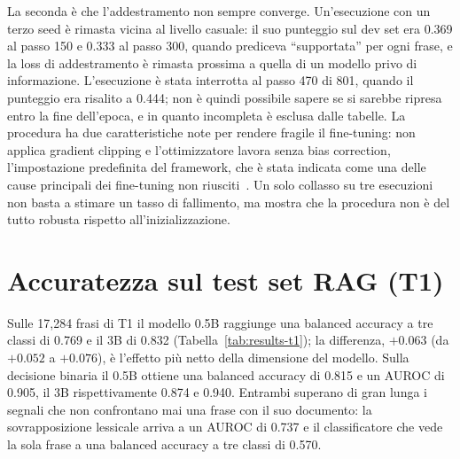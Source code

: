 La seconda è che l'addestramento non sempre converge. Un'esecuzione con un terzo seed è rimasta vicina al livello
casuale: il suo punteggio sul dev set era 0.369 al passo 150 e 0.333 al passo 300, quando prediceva ``supportata'' per
ogni frase, e la loss di addestramento è rimasta prossima a quella di un modello privo di informazione. L'esecuzione è
stata interrotta al passo 470 di 801, quando il punteggio era risalito a 0.444; non è quindi possibile sapere se si
sarebbe ripresa entro la fine dell'epoca, e in quanto incompleta è esclusa dalle tabelle. La procedura ha due
caratteristiche note per rendere fragile il fine-tuning: non applica gradient clipping e l'ottimizzatore lavora senza
bias correction, l'impostazione predefinita del framework, che è stata indicata come una delle cause principali dei
fine-tuning non riusciti~\cite{pascanu2013difficulty,mosbach2021stability}. Un solo collasso su tre esecuzioni non
basta a stimare un tasso di fallimento, ma mostra che la procedura non è del tutto robusta rispetto
all'inizializzazione.

\section{Accuratezza sul test set RAG (T1)}
\label{sec:results-t1}

Sulle 17{,}284 frasi di T1 il modello 0.5B raggiunge una balanced accuracy a tre classi di 0.769 e il 3B di 0.832
(Tabella~\ref{tab:results-t1}); la differenza, $+0.063$ (da $+0.052$ a $+0.076$), è l'effetto più netto della
dimensione del modello. Sulla decisione binaria il 0.5B ottiene una balanced accuracy di 0.815 e un AUROC di 0.905, il
3B rispettivamente 0.874 e 0.940. Entrambi superano di gran lunga i segnali che non confrontano mai una frase con il suo
documento: la sovrapposizione lessicale arriva a un AUROC di 0.737 e il classificatore che vede la sola frase a una
balanced accuracy a tre classi di 0.570.

